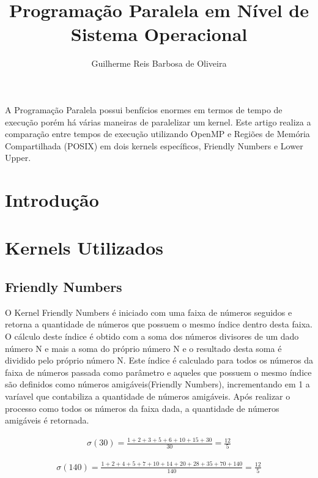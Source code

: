\documentclass[12pt]{article}
\title{Programação Paralela em Nível de Sistema Operacional}
\author{Guilherme Reis Barbosa de Oliveira\inst{1}}
\begin{document}
 

\maketitle

\begin{abstract}
  
\end{abstract}
     
\begin{resumo} 
  A Programação Paralela possui benfícios enormes em termos de tempo de execução porém há várias maneiras de 
  paralelizar um kernel. Este artigo realiza a comparação entre tempos de execução utilizando OpenMP e Regiões de Memória
  Compartilhada (POSIX) em dois kernels específicos, Friendly Numbers e Lower Upper. 
\end{resumo}


\section{Introdução}


\section{Kernels Utilizados}
\subsection{Friendly Numbers}

O Kernel Friendly Numbers é iniciado com uma faixa de números seguidos e retorna a quantidade de números que possuem o mesmo índice dentro desta faixa. O cálculo deste índice é obtido com a soma dos números divisores de um dado número N e mais a soma do próprio número N e o resultado desta soma é dividido pelo próprio número N. Este índice é calculado para todos os números da faixa de números passada como parâmetro e aqueles que possuem o mesmo índice são definidos como números amigáveis(Friendly Numbers), incrementando em 1 a varíavel que contabiliza a quantidade de números amigáveis. Após realizar o processo como todos os números da faixa dada, a quantidade de números amigáveis é retornada. 

\begin{gather*}
{\sigma \left ( 30 \right )} =  \frac{1+2+3+5+6+10+15+30}{30} = \frac{12}{5}
\end{gather*}

\begin{gather*}
{\sigma \left ( 140 \right )} = \frac{1+2+4+5+7+10+14+20+28+35+70+140}{140}=\frac{12}{5}
\end{gather*}
\end{document}
